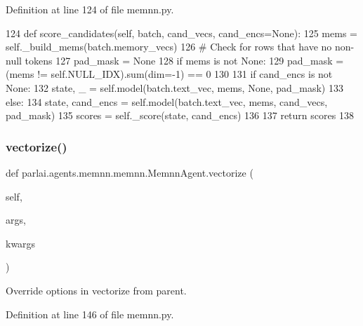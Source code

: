 Definition at line 124 of file memnn.\+py.


\begin{DoxyCode}
124     \textcolor{keyword}{def }score\_candidates(self, batch, cand\_vecs, cand\_encs=None):
125         mems = self.\_build\_mems(batch.memory\_vecs)
126         \textcolor{comment}{# Check for rows that have no non-null tokens}
127         pad\_mask = \textcolor{keywordtype}{None}
128         \textcolor{keywordflow}{if} mems \textcolor{keywordflow}{is} \textcolor{keywordflow}{not} \textcolor{keywordtype}{None}:
129             pad\_mask = (mems != self.NULL\_IDX).sum(dim=-1) == 0
130 
131         \textcolor{keywordflow}{if} cand\_encs \textcolor{keywordflow}{is} \textcolor{keywordflow}{not} \textcolor{keywordtype}{None}:
132             state, \_ = self.model(batch.text\_vec, mems, \textcolor{keywordtype}{None}, pad\_mask)
133         \textcolor{keywordflow}{else}:
134             state, cand\_encs = self.model(batch.text\_vec, mems, cand\_vecs, pad\_mask)
135         scores = self.\_score(state, cand\_encs)
136 
137         \textcolor{keywordflow}{return} scores
138 
\end{DoxyCode}
\mbox{\label{classparlai_1_1agents_1_1memnn_1_1memnn_1_1MemnnAgent_a4c2d3c0bb7d0b78b1c6aa91eca8dd24e}} 
\subsubsection{\texorpdfstring{vectorize()}{vectorize()}}
{\footnotesize\ttfamily def parlai.\+agents.\+memnn.\+memnn.\+Memnn\+Agent.\+vectorize (\begin{DoxyParamCaption}\item[{}]{self,  }\item[{}]{args,  }\item[{}]{kwargs }\end{DoxyParamCaption})}

\begin{DoxyVerb}Override options in vectorize from parent.
\end{DoxyVerb}
 

Definition at line 146 of file memnn.\+py.



